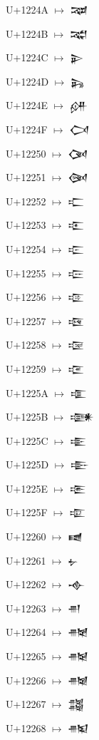 {\noindent U+1224A  $\mapsto$ {\cufont 𒉊}\par
\noindent U+1224B  $\mapsto$ {\cufont 𒉋}\par
\noindent U+1224C  $\mapsto$ {\cufont 𒉌}\par
\noindent U+1224D  $\mapsto$ {\cufont 𒉍}\par
\noindent U+1224E  $\mapsto$ {\cufont 𒉎}\par
\noindent U+1224F  $\mapsto$ {\cufont 𒉏}\par
\noindent U+12250  $\mapsto$ {\cufont 𒉐}\par
\noindent U+12251  $\mapsto$ {\cufont 𒉑}\par
\noindent U+12252  $\mapsto$ {\cufont 𒉒}\par
\noindent U+12253  $\mapsto$ {\cufont 𒉓}\par
\noindent U+12254  $\mapsto$ {\cufont 𒉔}\par
\noindent U+12255  $\mapsto$ {\cufont 𒉕}\par
\noindent U+12256  $\mapsto$ {\cufont 𒉖}\par
\noindent U+12257  $\mapsto$ {\cufont 𒉗}\par
\noindent U+12258  $\mapsto$ {\cufont 𒉘}\par
\noindent U+12259  $\mapsto$ {\cufont 𒉙}\par
\noindent U+1225A  $\mapsto$ {\cufont 𒉚}\par
\noindent U+1225B  $\mapsto$ {\cufont 𒉛}\par
\noindent U+1225C  $\mapsto$ {\cufont 𒉜}\par
\noindent U+1225D  $\mapsto$ {\cufont 𒉝}\par
\noindent U+1225E  $\mapsto$ {\cufont 𒉞}\par
\noindent U+1225F  $\mapsto$ {\cufont 𒉟}\par
\noindent U+12260  $\mapsto$ {\cufont 𒉠}\par
\noindent U+12261  $\mapsto$ {\cufont 𒉡}\par
\noindent U+12262  $\mapsto$ {\cufont 𒉢}\par
\noindent U+12263  $\mapsto$ {\cufont 𒉣}\par
\noindent U+12264  $\mapsto$ {\cufont 𒉤}\par
\noindent U+12265  $\mapsto$ {\cufont 𒉥}\par
\noindent U+12266  $\mapsto$ {\cufont 𒉦}\par
\noindent U+12267  $\mapsto$ {\cufont 𒉧}\par
\noindent U+12268  $\mapsto$ {\cufont 𒉨}\par
}
